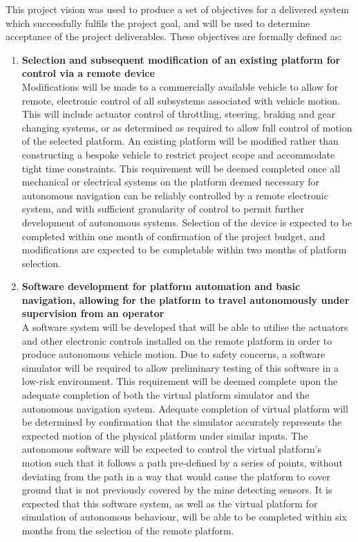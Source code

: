 \documentclass[main.tex]{subfiles}
\begin{document}
This project vision was used to produce a set of objectives for a delivered system which successfully fulfils the project goal, and will be used to determine acceptance of the project deliverables. 
These objectives are formally defined as:

\begin{enumerate}
\item \textbf{Selection and subsequent modification of an existing platform for control via a remote device}\\ 
Modifications will be made to a commercially available vehicle to allow for remote, electronic control of all subsystems associated with vehicle motion. This will include actuator control of throttling, steering, braking and gear changing systems, or as determined as required to allow full control of motion of the selected platform.
An existing platform will be modified rather than constructing a bespoke vehicle to restrict project scope and accommodate tight time constraints. 
This requirement will be deemed completed once all mechanical or electrical systems on the platform deemed necessary for autonomous navigation can be reliably controlled by a remote electronic system, and with sufficient granularity of control to permit further development of autonomous systems. 
Selection of the device is expected to be completed within one month of confirmation of the project budget, and modifications are expected to be completable within two months of platform selection. 

\item \textbf{Software development for platform automation and basic navigation, allowing for the platform to travel autonomously under supervision from an operator}\\ 
A software system will be developed that will be able to utilise the actuators and other electronic controls installed on the remote platform in order to produce autonomous vehicle motion. 
Due to safety concerns, a software simulator will be required to allow preliminary testing of this software in a low-risk environment. 
This requirement will be deemed complete upon the adequate completion of both the virtual platform simulator and the autonomous navigation system. 
Adequate completion of virtual platform will be determined by confirmation that the simulator accurately represents the expected motion of the physical platform under similar inputs. 
The autonomous software will be expected to control the virtual platform’s motion such that it follows a path pre-defined by a series of points, without deviating from the path in a way that would cause the platform to cover ground that is not previously covered by the mine detecting sensors. 
It is expected that this software system, as well as the virtual platform for simulation of autonomous behaviour, will be able to be completed within six months from the selection of the remote platform.


\end{enumerate}
\end{document}
